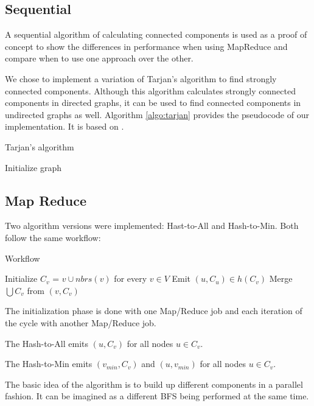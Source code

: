 \subsection{Sequential}
A sequential algorithm of calculating connected components is used as a proof of concept to show the differences in performance when using MapReduce and compare when to use one approach over the other.

We chose to implement a variation of Tarjan's algorithm to find strongly connected components. Although this algorithm calculates strongly connected components in directed graphs, it can be used to find connected components in undirected graphs as well. Algorithm \ref{algo:tarjan} provides the pseudocode of our implementation. It is based on \cite{tarjan}.

\begin{algorithm}
	\caption{Tarjan's algorithm}
	\label{algo:tarjan}
	\begin{algorithmic}[1]
		\State Initialize graph
	\end{algorithmic}
\end{algorithm}


\subsection{Map Reduce}

Two algorithm versions were implemented: Hast-to-All and Hash-to-Min. Both follow the same workflow:

\begin{algorithm}
\caption{Workflow}
\label{algo:workflow}
\begin{algorithmic}[1]
\State Initialize $C_{v}$ = ${v} \cup nbrs(v)$ for every $v \in V$
\Repeat
\State Emit $(u, C_u) \in h(C_ v)$
\State Merge $\bigcup C_v$ from $(v, C_v)$
\end{algorithmic}
\end{algorithm}

The initialization phase is done with one Map/Reduce job and each iteration of the cycle with another Map/Reduce job.

The Hash-to-All emits $(u, C_v)$ for all nodes $u \in C_v$.

The Hash-to-Min emits $(v_{min}, C_v)$ and $(u, v_{min})$ for all nodes $u \in C_v$.

The basic idea of the algorithm is to build up different components in a parallel fashion. It can be imagined as a different BFS being performed at the same time.

